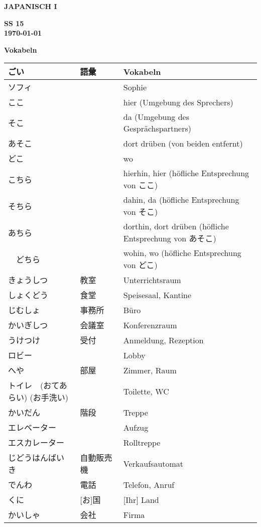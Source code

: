 \documentclass[a4paper,10pt]{article}
\def\header#1#2#3#4#5#6{\pagestyle{empty}
\noindent
\begin{minipage}[t]{0.6\textwidth}
\begin{flushleft}
\bf #4\\%
#5 %
\end{flushleft}
\end{minipage}
\begin{minipage}[t]{0.4\textwidth}
\begin{flushright}
\bf #6\\
#2 %
\end{flushright}
\end{minipage}

\begin{center}
{\Large\bf Vokabeln} %

\end{center}
}
\begin{document}
\header{Nr. 2 \\}{\today}{11.05.15}{JAPANISCH I}{}{SS 15}
\pagestyle{plain}
\begin{CJK}{UTF8}{min}
\begin{center}
\begin{longtable}{|p{4cm}|p{2cm}|p{8cm}|}
  \hline
  ごい & 語彙 & Vokabeln \\
  \hline \hline
  ソフィ	& & Sophie \\
  \hline
  ここ　& & hier (Umgebung des Sprechers) \\
  \hline  
  そこ  & & da (Umgebung des Gespr\"achspartners) \\  
  \hline
  あそこ	& & dort dr\"uben (von beiden entfernt) \\
  \hline
  どこ　& & wo \\
  \hline  
  こちら  & & hierhin, hier (h\"ofliche Entsprechung von ここ)\\
  \hline
  そちら	& & dahin, da (h\"ofliche Entsprechung von そこ)\\
  \hline
  あちら　& & dorthin, dort dr\"uben (h\"ofliche Entsprechung von \newline あそこ)\\
  \hline
　どちら  & & wohin, wo (h\"ofliche Entsprechung von どこ)\\
  \hline
  きょうしつ & 教室 & Unterrichtsraum\\
  \hline
  しょくどう & 食堂　　& Speisesaal, Kantine \\
  \hline
  じむしょ　& 事務所　& B\"uro\\
  \hline  
  かいぎしつ　& 会議室　& Konferenzraum\\
  \hline
  うけつけ &	受付　& Anmeldung, Rezeption\\
  \hline
  ロビー　& & Lobby\\
  \hline  
  へや &	部屋　& Zimmer, Raum\\
  \hline
  トイレ　(おてあらい) (お手洗い) & & Toilette, WC\\
  \hline
  かいだん &	階段　& Treppe\\
  \hline  
  エレベーター & & Aufzug\\
  \hline
  エスカレーター & & Rolltreppe\\
  \hline
  じどうはんばいき	& 自動販売機　& Verkaufsautomat\\
  \hline  
  でんわ & 電話  & Telefon, Anruf\\
  \hline
  [お]くに & [お]国	& [Ihr] Land \\
  \hline
  かいしゃ &	会社　& Firma\\

\end{longtable}
\end{center}
\end{CJK}
\end{document}
